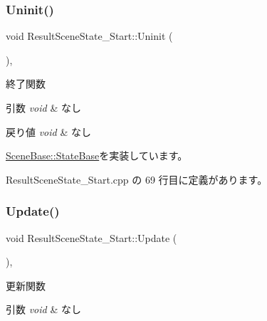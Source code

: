 \subsubsection{\texorpdfstring{Uninit()}{Uninit()}}
{\footnotesize\ttfamily void Result\+Scene\+State\+\_\+\+Start\+::\+Uninit (\begin{DoxyParamCaption}{ }\end{DoxyParamCaption})\hspace{0.3cm}{\ttfamily [override]}, {\ttfamily [virtual]}}



終了関数 


\begin{DoxyParams}{引数}
{\em void} & なし \\
\hline
\end{DoxyParams}

\begin{DoxyRetVals}{戻り値}
{\em void} & なし \\
\hline
\end{DoxyRetVals}


\mbox{\hyperlink{class_scene_base_1_1_state_base_a2763fa37e45b39bd8d3bbb735c76c59b}{Scene\+Base\+::\+State\+Base}}を実装しています。



 Result\+Scene\+State\+\_\+\+Start.\+cpp の 69 行目に定義があります。

\mbox{\label{class_result_scene_state___start_a2ecdef2bef0cd1a04055e8687e11199b}} 
\subsubsection{\texorpdfstring{Update()}{Update()}}
{\footnotesize\ttfamily void Result\+Scene\+State\+\_\+\+Start\+::\+Update (\begin{DoxyParamCaption}{ }\end{DoxyParamCaption})\hspace{0.3cm}{\ttfamily [override]}, {\ttfamily [virtual]}}



更新関数 


\begin{DoxyParams}{引数}
{\em void} & なし \\
\hline
\end{DoxyParams}

